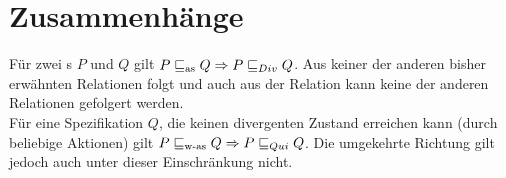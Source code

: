\section{Zusammenhänge}

\begin{Satz}
  \label{ZusammenhDivSatz}
  Für zwei \MEIO{}s $P$ und $Q$ gilt $P \sqsubseteq _{\mathrm{as}} Q \Rightarrow P  \sqsubseteq  _{Div} Q$. Aus
  keiner der anderen bisher erwähnten Relationen folgt \DRel{} und auch aus der
  Relation \DRel{} kann keine der anderen Relationen gefolgert werden.\\
  Für eine Spezifikation $Q$, die keinen divergenten Zustand erreichen kann
  (durch beliebige Aktionen) gilt $P \sqsubseteq _{\mathrm{w}\text{-}\mathrm{as}} Q \Rightarrow P  \sqsubseteq  _{Qui} Q$. Die
  umgekehrte Richtung gilt jedoch auch unter dieser Einschränkung nicht.
\end{Satz}
